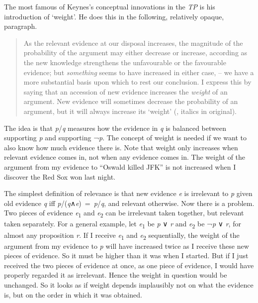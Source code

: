 \documentclass[
  10pt,
  letterpaper,
  DIV=11,
  numbers=noendperiod,
  twoside]{scrartcl}
\begin{document}
The most famous of Keynes's conceptual innovations in the \emph{TP} is
his introduction of `weight'. He does this in the following, relatively
opaque, paragraph.

\begin{quote}
As the relevant evidence at our disposal increases, the magnitude of the
probability of the argument may either decrease or increase, according
as the new knowledge strengthens the unfavourable or the favourable
evidence; but \emph{something} seems to have increased in either case,
-- we have a more substantial basis upon which to rest our conclusion. I
express this by saying that an accession of new evidence increases the
\emph{weight} of an argument. New evidence will sometimes decrease the
probability of an argument, but it will always increase its `weight'
(, italics in original).
\end{quote}

The idea is that \emph{p}/\emph{q} measures how the evidence in \emph{q}
is balanced between supporting \emph{p} and supporting ¬\emph{p}. The
concept of weight is needed if we want to also know how much evidence
there is. Note that weight only increases when relevant evidence comes
in, not when any evidence comes in. The weight of the argument from my
evidence to ``Oswald killed JFK'' is not increased when I discover the
Red Sox won last night.

The simplest definition of relevance is that new evidence \emph{e} is
irrelevant to \emph{p} given old evidence \emph{q} iff
\emph{p}/(\emph{q}∧\emph{e})~=~\emph{p}/\emph{q}, and relevant
otherwise. Now there is a problem. Two pieces of evidence
\emph{e}\textsubscript{1} and \emph{e}\textsubscript{2} can be
irrelevant taken together, but relevant taken separately. For a general
example, let \emph{e}\textsubscript{1} be \emph{p} ∨ \emph{r} and
\emph{e}\textsubscript{2} be ¬\emph{p} ∨ \emph{r}, for almost any
proposition \emph{r}. If I receive \emph{e}\textsubscript{1} and
\emph{e}\textsubscript{2} sequentially, the weight of the argument from
my evidence to \emph{p} will have increased twice as I receive these new
pieces of evidence. So it must be higher than it was when I started. But
if I just received the two pieces of evidence at once, as one piece of
evidence, I would have properly regarded it as irrelevant. Hence the
weight in question would be unchanged. So it looks as if weight depends
implausibly not on what the evidence is, but on the order in which it
was obtained.
\end{document}
